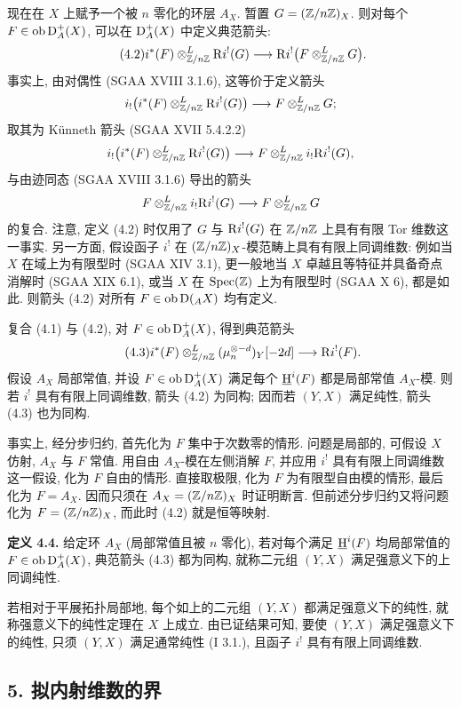 现在在 $X$ 上赋予一个被 $n$ 零化的环层 $A_X$. 暂置 $G=(\mathbb Z/n\mathbb Z)_X$. 则对每个 $F\in\operatorname{ob}\mathrm{D}_A^+(X)$, 可以在 $\mathrm{D}_A^+(X)$ 中定义典范箭头:
\begin{equation}\tag{4.2}
        i^*(F)\otimes^L_{\mathbb Z/n\mathbb Z} \mathrm R i^!(G)\longrightarrow \mathrm R i^!\bigl(F\otimes^L_{\mathbb Z/n\mathbb Z}G\bigr).
\end{equation}
事实上, 由对偶性 (SGAA XVIII 3.1.6), 这等价于定义箭头
\[
        i_!\bigl(i^*(F)\otimes^L_{\mathbb Z/n\mathbb Z}\mathrm R i^!(G)\bigr)\longrightarrow F\otimes^L_{\mathbb Z/n\mathbb Z}G;
\]
取其为 Künneth 箭头 (SGAA XVII 5.4.2.2)
\[
        i_!\bigl(i^*(F)\otimes^L_{\mathbb Z/n\mathbb Z}\mathrm R i^!(G)\bigr)\longrightarrow F\otimes^L_{\mathbb Z/n\mathbb Z}i_!\mathrm R i^!(G),
\]
与由迹同态 (SGAA XVIII 3.1.6) 导出的箭头
\[
        F\otimes^L_{\mathbb Z/n\mathbb Z}i_!\mathrm R i^!(G)\longrightarrow F\otimes^L_{\mathbb Z/n\mathbb Z}G
\]
的复合.
注意, 定义 (4.2) 时仅用了 $G$ 与 $\mathrm R i^!(G)$ 在 $\mathbb Z/n\mathbb Z$ 上具有有限 Tor 维数这一事实. 另一方面, 假设函子 $i^!$ 在 $(\mathbb Z/n\mathbb Z)_X$-模范畴上具有有限上同调维数: 例如当 $X$ 在域上为有限型时 (SGAA XIV 3.1), 更一般地当 $X$ 卓越且等特征并具备奇点消解时 (SGAA XIX 6.1), 或当 $X$ 在 $\operatorname{Spec}(\mathbb Z)$ 上为有限型时 (SGAA X 6), 都是如此. 则箭头 (4.2) 对所有 $F\in\operatorname{ob}\mathrm{D}({}_A X)$ 均有定义.

复合 (4.1) 与 (4.2), 对 $F\in\operatorname{ob}\mathrm{D}_A^+(X)$, 得到典范箭头
\begin{equation}\tag{4.3}
        i^*(F)\otimes^L_{\mathbb Z/n\mathbb Z}(\mu_n^{\otimes -d})_Y[-2d]\longrightarrow \mathrm R i^!(F).
\end{equation}
假设 $A_X$ 局部常值, 并设 $F\in\operatorname{ob}\mathrm{D}_A^+(X)$ 满足每个 $\underline{\mathrm H}^i(F)$ 都是局部常值 $A_X$-模. 则若 $i^!$ 具有有限上同调维数, 箭头 (4.2) 为同构; 因而若 $(Y,X)$ 满足纯性, 箭头 (4.3) 也为同构.

事实上, 经分步归约, 首先化为 $F$ 集中于次数零的情形. 问题是局部的, 可假设 $X$ 仿射, $A_X$ 与 $F$ 常值. 用自由 $A_X$-模在左侧消解 $F$, 并应用 $i^!$ 具有有限上同调维数这一假设, 化为 $F$ 自由的情形. 直接取极限, 化为 $F$ 为有限型自由模的情形, 最后化为 $F=A_X$. 因而只须在 $A_X=(\mathbb Z/n\mathbb Z)_X$ 时证明断言. 但前述分步归约又将问题化为 $F=(\mathbb Z/n\mathbb Z)_X$, 而此时 (4.2) 就是恒等映射.

\textbf{定义 4.4.} 给定环 $A_X$ (局部常值且被 $n$ 零化), 若对每个满足 $\underline{\mathrm H}^i(F)$ 均局部常值的 $F\in\operatorname{ob}\mathrm{D}_A^+(X)$, 典范箭头 (4.3) 都为同构, 就称二元组 $(Y,X)$ 满足强意义下的上同调纯性.

若相对于平展拓扑局部地, 每个如上的二元组 $(Y,X)$ 都满足强意义下的纯性, 就称强意义下的纯性定理在 $X$ 上成立. 由已证结果可知, 要使 $(Y,X)$ 满足强意义下的纯性, 只须 $(Y,X)$ 满足通常纯性 (I 3.1.), 且函子 $i^!$ 具有有限上同调维数.

\subsection*{5. 拟内射维数的界}


